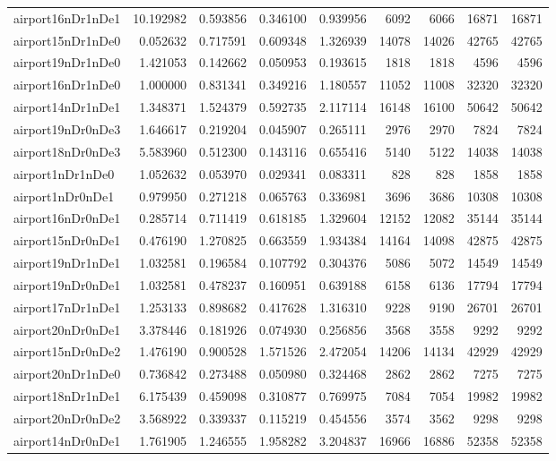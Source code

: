 \begin{longtable}{|l|r|r|r|r|r|r|r|r|}
airport16nDr1nDe1 & 10.192982 & 0.593856 & 0.346100 & 0.939956 & 6092 & 6066 & 16871 & 16871 \\
airport15nDr1nDe0 & 0.052632 & 0.717591 & 0.609348 & 1.326939 & 14078 & 14026 & 42765 & 42765 \\
airport19nDr1nDe0 & 1.421053 & 0.142662 & 0.050953 & 0.193615 & 1818 & 1818 & 4596 & 4596 \\
airport16nDr1nDe0 & 1.000000 & 0.831341 & 0.349216 & 1.180557 & 11052 & 11008 & 32320 & 32320 \\
airport14nDr1nDe1 & 1.348371 & 1.524379 & 0.592735 & 2.117114 & 16148 & 16100 & 50642 & 50642 \\
airport19nDr0nDe3 & 1.646617 & 0.219204 & 0.045907 & 0.265111 & 2976 & 2970 & 7824 & 7824 \\
airport18nDr0nDe3 & 5.583960 & 0.512300 & 0.143116 & 0.655416 & 5140 & 5122 & 14038 & 14038 \\
airport1nDr1nDe0 & 1.052632 & 0.053970 & 0.029341 & 0.083311 & 828 & 828 & 1858 & 1858 \\
airport1nDr0nDe1 & 0.979950 & 0.271218 & 0.065763 & 0.336981 & 3696 & 3686 & 10308 & 10308 \\
airport16nDr0nDe1 & 0.285714 & 0.711419 & 0.618185 & 1.329604 & 12152 & 12082 & 35144 & 35144 \\
airport15nDr0nDe1 & 0.476190 & 1.270825 & 0.663559 & 1.934384 & 14164 & 14098 & 42875 & 42875 \\
airport19nDr1nDe1 & 1.032581 & 0.196584 & 0.107792 & 0.304376 & 5086 & 5072 & 14549 & 14549 \\
airport19nDr0nDe1 & 1.032581 & 0.478237 & 0.160951 & 0.639188 & 6158 & 6136 & 17794 & 17794 \\
airport17nDr1nDe1 & 1.253133 & 0.898682 & 0.417628 & 1.316310 & 9228 & 9190 & 26701 & 26701 \\
airport20nDr0nDe1 & 3.378446 & 0.181926 & 0.074930 & 0.256856 & 3568 & 3558 & 9292 & 9292 \\
airport15nDr0nDe2 & 1.476190 & 0.900528 & 1.571526 & 2.472054 & 14206 & 14134 & 42929 & 42929 \\
airport20nDr1nDe0 & 0.736842 & 0.273488 & 0.050980 & 0.324468 & 2862 & 2862 & 7275 & 7275 \\
airport18nDr1nDe1 & 6.175439 & 0.459098 & 0.310877 & 0.769975 & 7084 & 7054 & 19982 & 19982 \\
airport20nDr0nDe2 & 3.568922 & 0.339337 & 0.115219 & 0.454556 & 3574 & 3562 & 9298 & 9298 \\
airport14nDr0nDe1 & 1.761905 & 1.246555 & 1.958282 & 3.204837 & 16966 & 16886 & 52358 & 52358 \\

\end{longtable}
